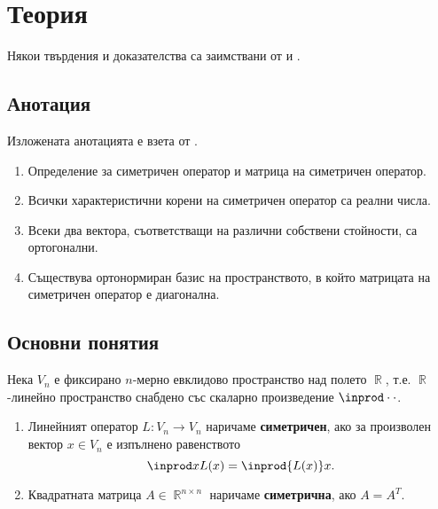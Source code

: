 \documentclass{../../common/topic}
\begin{document}
\maketitle

\section{Теория}

Някои твърдения и доказателства са заимствани от \cite{Knapp2016BasicAlgebra} и \cite{RoyachkiNotes}.

\subsection{Анотация}

Изложената анотацията е взета от \cite{Syllabus}.

\begin{enumerate}
  \item Определение за симетричен оператор и матрица на симетричен оператор.
  \item Всички характеристични корени на симетричен оператор са реални числа.
  \item Всеки два вектора, съответстващи на различни собствени стойности, са ортогонални.
  \item Съществува ортонормиран базис на пространството, в който матрицата на симетричен оператор е диагонална.
\end{enumerate}

\subsection{Основни понятия}

Нека \( V_n \) е фиксирано \( n \)-мерно евклидово пространство над полето \( \BbbR \), т.е. \( \BbbR \)-линейно пространство снабдено със скаларно произведение \( \inprod \cdot \cdot \).

\begin{definition}
  \hfill
  \begin{enumerate}
    \item Линейният оператор \( L: V_n \to V_n \) наричаме \textbf{симетричен}, ако за произволен вектор \( x \in V_n \) е изпълнено равенството
    \begin{equation*}
      \inprod x {L(x)} = \inprod {L(x)} x.
    \end{equation*}

    \item Квадратната матрица \( A \in \BbbR^{n \times n} \) наричаме \textbf{симетрична}, ако \( A = A^T \).
  \end{enumerate}
\end{definition}
\end{document}
